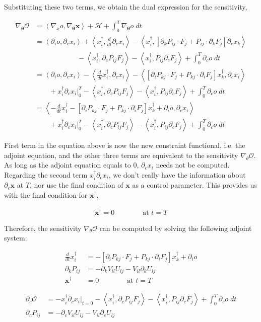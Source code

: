 \documentclass[11pt]{article}
\def\Dnorm#1#2{ \frac{d #1 }{ d #2} }
\newcommand\eqsp[2]{
\begin{equation#1}
\begin{split}
#2
\end{split}
\end{equation#1}
}
\newcommand{\cH}{\mathcal{H}}
\newcommand{\cO}{\mathcal{O}}
\newcommand{\bx}{\mathbf{x}}
\newcommand{\bt}{\mathbf{\theta}}
\newcommand{\inprod}[2]{\left\langle #1,#2 \right\rangle}
\begin{document}
Substituting these two terms, we obtain the dual expression for the sensitivity,
\eqsp{*}{
\nabla_{\bt}\cO &= \inprod{\nabla_xo}{\nabla_{\bt}\bx} + \cH + \int_0^T \nabla_{\bt}o\;dt\\
&= \inprod{\partial_io}{\partial_cx_i}
+ \inprod{x_i^{\dagger}}{\Dnorm{}{t}\partial_cx_i}
- \inprod{x_i^{\dagger}}{\left[ \partial_kP_{ij}\cdot F_j + P_{ij}\cdot\partial_kF_j \right]\partial_cx_k}\\
&\qquad\qquad\qquad - \inprod{x_i^{\dagger}}{\partial_cP_{ij}F_j} - \inprod{x_i^{\dagger}}{P_{ij}\partial_cF_j} + \int_0^T \partial_co\;dt\\
&= \inprod{\partial_io}{\partial_cx_i}
- \inprod{\Dnorm{}{t}x_i^{\dagger}}{\partial_cx_i}
- \inprod{ \left[ \partial_iP_{kj}\cdot F_j + P_{kj}\cdot\partial_iF_j \right]x_k^{\dagger} }{ \partial_cx_i }\\
&\qquad +x_i^{\dagger}\partial_cx_i\bigg|_{0}^{T}
- \inprod{x_i^{\dagger}}{\partial_cP_{ij}F_j}
- \inprod{x_i^{\dagger}}{P_{ij}\partial_cF_j}
+ \int_0^T \partial_co\;dt\\
&= \inprod{-\Dnorm{}{t}x_i^{\dagger} - \left[ \partial_iP_{kj}\cdot F_j + P_{kj}\cdot\partial_iF_j \right]x_k^{\dagger} + \partial_io }{\partial_cx_i}\\
&\qquad +x_i^{\dagger}\partial_cx_i\bigg|_{0}^{T}
- \inprod{x_i^{\dagger}}{\partial_cP_{ij}F_j}
- \inprod{x_i^{\dagger}}{P_{ij}\partial_cF_j}
+ \int_0^T \partial_co\;dt
}
First term in the equation above is now the new constraint functional, i.e. the adjoint equation,
and the other three terms are equivalent to the sensitivity $\nabla_\theta\cO$.
As long as the adjoint equation equals to 0, $\partial_cx_i$ needs not be computed.
Regarding the second term $x_i^{\dagger}\partial_cx_i$,
we don't really have the information about $\partial_c\bx$ at $T$,
nor use the final condition of $\bx$ as a control parameter.
This provides us with the final condition for $\bx^{\dagger}$,
\eqsp{*}{
\bx^{\dagger} = 0\qquad\qquad \text{at }t=T
}
Therefore, the sensitivity $\nabla_\theta\cO$ can be computed by solving the following adjoint system:
\eqsp{*}{
\Dnorm{}{t}x_i^{\dagger} &= - \left[ \partial_iP_{kj}\cdot F_j + P_{kj}\cdot\partial_iF_j \right]x_k^{\dagger} + \partial_io\\
\partial_kP_{ij} &= -\partial_kV_{il}U_{lj} - V_{il}\partial_kU_{lj}\\
\bx^{\dagger} &= 0\qquad\qquad \text{at }t=T
}
\eqsp{*}{
\partial_c\cO &= - x_i^{\dagger}\partial_cx_i\bigg|_{t=0}
- \inprod{x_i^{\dagger}}{\partial_cP_{ij}F_j}
- \inprod{x_i^{\dagger}}{P_{ij}\partial_cF_j}
+ \int_0^T \partial_co\;dt\\
\partial_cP_{ij} &= -\partial_cV_{il}U_{lj} - V_{il}\partial_cU_{lj}
}
\end{document}
